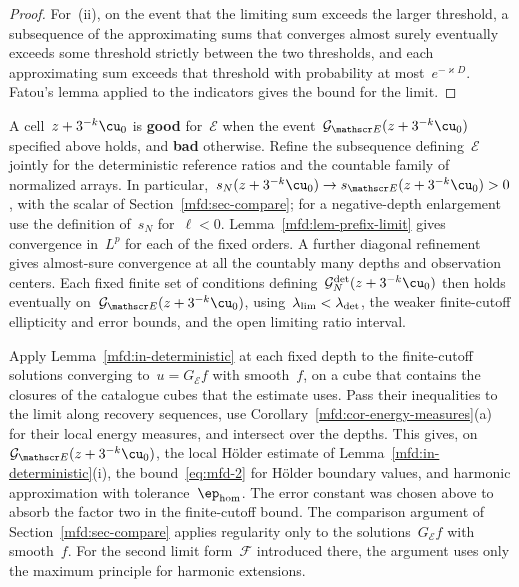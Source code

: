 \documentclass[11pt]{amsart}
\begin{document}
\begin{proof}
\smallskip

For~(ii), on the event that the limiting sum exceeds the larger threshold, a subsequence of the approximating sums that converges almost surely eventually exceeds some threshold strictly between the two thresholds, and each approximating sum exceeds that threshold with probability at most~$e^{-\varkappa D}$. Fatou's lemma applied to the indicators gives the bound for the limit.
\end{proof}

A cell~$z+3^{-k}\cu_0$ is \textbf{good} for~$\mathscr E$ when the event~$\mathcal G_{\mathscr E}(z+3^{-k}\cu_0)$ specified above holds, and \textbf{bad} otherwise. Refine the subsequence defining~$\mathscr E$ jointly for the deterministic reference ratios and the countable family of normalized arrays. In particular,~$s_N(z+3^{-k}\cu_0)\to s_{\mathscr E}(z+3^{-k}\cu_0)>0$, with the scalar of Section~\ref{mfd:sec-compare}; for a negative-depth enlargement use the definition of~$s_N$ for~$\ell<0$. Lemma~\ref{mfd:lem-prefix-limit} gives convergence in~$L^p$ for each of the fixed orders. A further diagonal refinement gives almost-sure convergence at all the countably many depths and observation centers. Each fixed finite set of conditions defining~$\mathcal G_N^{\rm det}(z+3^{-k}\cu_0)$ then holds eventually on~$\mathcal G_{\mathscr E}(z+3^{-k}\cu_0)$, using~$\lambda_{\rm lim}<\lambda_{\rm det}$, the weaker finite-cutoff ellipticity and error bounds, and the open limiting ratio interval.

\smallskip

Apply Lemma~\ref{mfd:in-deterministic} at each fixed depth to the finite-cutoff solutions converging to~$u=G_{\mathscr E}f$ with smooth~$f$, on a cube that contains the closures of the catalogue cubes that the estimate uses. Pass their inequalities to the limit along recovery sequences, use Corollary~\ref{mfd:cor-energy-measures}(a) for their local energy measures, and intersect over the depths. This gives, on~$\mathcal G_{\mathscr E}(z+3^{-k}\cu_0)$, the local H\"older estimate of Lemma~\ref{mfd:in-deterministic}(i), the bound~\eqref{eq:mfd-2} for H\"older boundary values, and harmonic approximation with tolerance~$\ep_{\rm hom}$. The error constant was chosen above to absorb the factor two in the finite-cutoff bound. The comparison argument of Section~\ref{mfd:sec-compare} applies regularity only to the solutions~$G_{\mathscr E}f$ with smooth~$f$. For the second limit form~$\mathscr F$ introduced there, the argument uses only the maximum principle for harmonic extensions.
\end{document}

